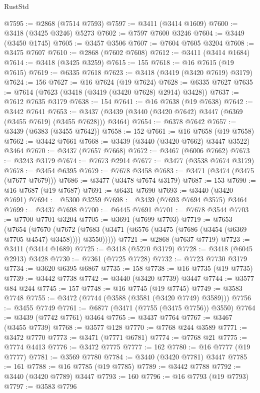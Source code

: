 \begin{lexlean}{RustStd}
\begin{coremodule}
{{{{{{{{{{{{{{{{{{{@7595 := @2868 (@7514 @7593)
@7597 := @3411 (@3414 @1609)
@7600 := @3418 (@3425 @3246) @5273
@7602 := @7597 @7600 @3246
@7604 := @3449 (@3450 @1745)
@7605 := @3457 @3506
@7607 := @7604 @7605 @3204
@7608 := @3475 @7607
@7610 := @2868 (@7602 @7608)
@7612 := @3411 (@3414 @1684)
@7614 := @3418 (@3425 @3259)
@7615 := 155
@7618 := @16 @7615 (@19 @7615)
@7619 := @6335 @7618
@7623 := @3418 (@3419 (@3420 @7619) @3179)
@7624 := 156
@7627 := @16 @7624 (@19 @7624)
@7628 := @6335 @7627
@7635 := @7614 (@7623 (@3418 (@3419 (@3420 @7628) @2914) @3428))
@7637 := @7612 @7635 @3179
@7638 := 154
@7641 := @16 @7638 (@19 @7638)
@7642 := @3442 @7641
@7653 := @3437 (@3439 (@3440 (@3420 @7642) @3447 (@6369 (@3455 @7619) (@3455 @7628))) @3464)
@7654 := @6378 @7642
@7657 := @3439 (@6383 (@3455 @7642))
@7658 := 152
@7661 := @16 @7658 (@19 @7658)
@7662 := @3442 @7661
@7668 := @3439 (@3440 (@3420 @7662) @3447 @3522) @3464
@7670 := @3437 (@7657 @7668)
@7672 := @3467 (@6006 @7662)
@7673 := @3243 @3179
@7674 := @7673 @2914
@7677 := @3477 (@3538 @7674 @3179)
@7678 := @3454 @6395
@7679 := @7678 @3458
@7683 := @3471 (@3474 (@3475 (@7677 @7679)))
@7686 := @3477 (@3478 @7674 @3179)
@7687 := 153
@7690 := @16 @7687 (@19 @7687)
@7691 := @6431 @7690
@7693 := @3440 (@3420 @7691)
@7694 := @5300 @3259
@7698 := @3439 (@7693 @7694 @3575) @3464
@7699 := @3437 @7698
@7700 := @6445 @7691
@7701 := @7678 @3544
@7703 := @7700 @7701 @3204
@7705 := @3691 (@7699 @7703)
@7719 := @7653
    (@7654
      (@7670
        (@7672 (@7683 (@3471 (@6576 (@3475 (@7686 (@3454 (@6369 @7705 @4547) @3458)))) @3550)))))
@7721 := @2868 (@7637 @7719)
@7723 := @3411 (@3414 @1689)
@7725 := @3418 (@5270 @3179)
@7728 := @3418 (@6045 @2913) @3428
@7730 := @7361 (@7725 @7728)
@7732 := @7723 @7730 @3179
@7734 := @3620 @6395 @6867
@7735 := 158
@7738 := @16 @7735 (@19 @7735)
@7739 := @3442 @7738
@7742 := @3440 (@3420 @7739) @3447
@7744 := @3577 @84 @244
@7745 := 157
@7748 := @16 @7745 (@19 @7745)
@7749 := @3583 @7748
@7755 := @3472 (@7744 (@3588 (@3581 (@3420 @7749) @3589)))
@7756 := @3455 @7749
@7761 := @6877 (@3471 (@7755 (@3475 @7756)) @3550)
@7764 := @3439 (@7742 @7761) @3464
@7765 := @3437 @7764
@7767 := @3467 (@3455 @7739)
@7768 := @3577 @128
@7770 := @7768 @244 @3589
@7771 := @3472 @7770
@7773 := @3471 (@7771 @6781)
@7774 := @7768 @21
@7775 := @7774 @4413
@7776 := @3472 @7775
@7777 := 162
@7780 := @16 @7777 (@19 @7777)
@7781 := @3569 @7780
@7784 := @3440 (@3420 @7781) @3447
@7785 := 161
@7788 := @16 @7785 (@19 @7785)
@7789 := @3442 @7788
@7792 := @3440 (@3420 @7789) @3447
@7793 := 160
@7796 := @16 @7793 (@19 @7793)
@7797 := @3583 @7796
}}}}}}}}}}}}}}}}}}}
\end{coremodule}
\end{lexlean}

